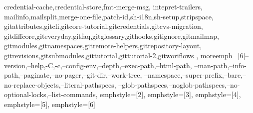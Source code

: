 {{    credential-cache,credential-store,fmt-merge-msg, intepret-trailers,
    mailinfo,mailsplit,merge-one-file,patch-id,sh-i18n,sh-setup,stripspace,
  gitattributes,gitcli,gitcore-tutorial,gitcredentials,gitcvs-migration,
  gitdiffcore,giteveryday,gitfaq,gitglossary,githooks,gitignore,gitmailmap,
  gitmodules,gitnamespaces,gitremote-helpers,gitrepository-layout,
  gitrevisions,gitsubmodules,gittutorial,gittutorial-2,gitworiflows
  },
  moreemph=[6]{--version,--help,-C,-c,--config-env,--depth,--exec-path,--html-path,
  --man-path,--info-path,--paginate,--no-pager,--git-dir,--work-tree,
  --namespace,--super-prefix,--bare,--no-replace-objects,--literal-pathspecs,
  --glob-pathspecs,--noglob-pathspecs,--no-optional-locks,--list-commands},
  emphstyle=[2]{\color{blue}},%
  emphstyle=[3]{\bfseries\color{magenta}},%
  emphstyle=[4]{\color{cyan}},%
  emphstyle=[5]{\color{cyan}},%
  emphstyle=[6]{\color{cyan}}%
}
